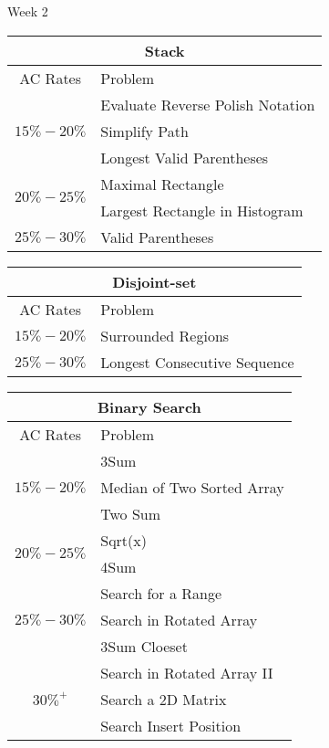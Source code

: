 \documentclass[paper=a4, fontsize=11pt]{scrartcl} %
\begin{document}
\begin{center}
  \pagebreak

  \begin{center}
    Week 2
  \end{center}

  \begin{tabular}{|c|l|}
      \hline
      \multicolumn{2}{|c|}{Stack} \\
      \hline
      AC Rates      &   Problem     \\
      \hline
      \multirow{3}{*}{$15\%-20\%$}  &    Evaluate Reverse Polish Notation    \\
          & Simplify Path    \\
          & Longest Valid Parentheses    \\
      \hline
      \multirow{2}{*}{$20\%-25\%$}  &   Maximal Rectangle    \\
          & Largest Rectangle in Histogram    \\
      \hline
      \multirow{1}{*}{$25\%-30\%$}  &   Valid Parentheses \\
      \hline
  \end{tabular}

  \vspace{20mm}

  \begin{tabular}{|c|l|}
      \hline
      \multicolumn{2}{|c|}{Disjoint-set} \\
      \hline
      AC Rates      &   Problem     \\
      \hline
      \multirow{1}{*}{$15\%-20\%$}  &    Surrounded Regions    \\
      \hline
      \multirow{1}{*}{$25\%-30\%$}  &   Longest Consecutive Sequence \\
      \hline
  \end{tabular}

  \vspace{20mm}

  \begin{tabular}{|c|l|}
      \hline
      \multicolumn{2}{|c|}{Binary Search} \\
      \hline
      AC Rates      &   Problem     \\
      \hline
      \multirow{3}{*}{$15\%-20\%$}  &   3Sum\\
          & Median of Two Sorted Array  \\
          & Two Sum \\
      \hline
      \multirow{2}{*}{$20\%-25\%$}  &   Sqrt(x)    \\
          & 4Sum\\
      \hline
      \multirow{3}{*}{$25\%-30\%$}  &   Search for a Range\\
          & Search in Rotated Array\\
          & 3Sum Cloeset\\
      \hline
      \multirow{3}{*}{$30\%^+$}  &   Search in Rotated Array II \\
          & Search a 2D Matrix    \\
          & Search Insert Position  \\
      \hline
  \end{tabular}


\end{center}
\end{document}
